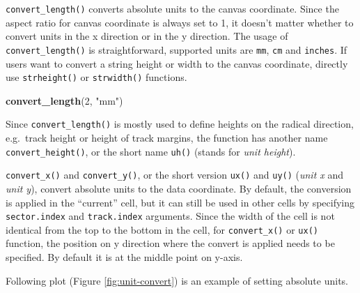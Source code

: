 \documentclass[]{book}
\newenvironment{Shaded}{\begin{snugshade}}{\end{snugshade}}
\newcommand{\KeywordTok}[1]{\textcolor[rgb]{0.13,0.29,0.53}{\textbf{#1}}}
\newcommand{\DecValTok}[1]{\textcolor[rgb]{0.00,0.00,0.81}{#1}}
\newcommand{\StringTok}[1]{\textcolor[rgb]{0.31,0.60,0.02}{#1}}
\newcommand{\NormalTok}[1]{#1}
\begin{document}
\texttt{convert\_length()} converts absolute units to the canvas
coordinate. Since the aspect ratio for canvas coordinate is always set
to 1, it doesn't matter whether to convert units in the x direction or
in the y direction. The usage of \texttt{convert\_length()} is
straightforward, supported units are \texttt{mm}, \texttt{cm} and
\texttt{inches}. If users want to convert a string height or width to
the canvas coordinate, directly use \texttt{strheight()} or
\texttt{strwidth()} functions.

\begin{Shaded}
\begin{Highlighting}[]
\KeywordTok{convert_length}\NormalTok{(}\DecValTok{2}\NormalTok{, }\StringTok{"mm"}\NormalTok{)}
\end{Highlighting}
\end{Shaded}

Since \texttt{convert\_length()} is mostly used to define heights on the
radical direction, e.g.~track height or height of track margins, the
function has another name \texttt{convert\_height()}, or the short name
\texttt{uh()} (stands for \emph{unit height}).

\texttt{convert\_x()} and \texttt{convert\_y()}, or the short version
\texttt{ux()} and \texttt{uy()} (\emph{unit x} and \emph{unit y}),
convert absolute units to the data coordinate. By default, the
conversion is applied in the ``current'' cell, but it can still be used
in other cells by specifying \texttt{sector.index} and
\texttt{track.index} arguments. Since the width of the cell is not
identical from the top to the bottom in the cell, for
\texttt{convert\_x()} or \texttt{ux()} function, the position on y
direction where the convert is applied needs to be specified. By default
it is at the middle point on y-axis.

Following plot (Figure \ref{fig:unit-convert}) is an example of setting
absolute units.
\end{document}
